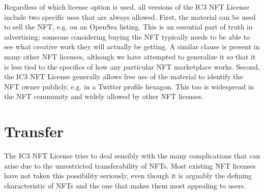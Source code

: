 \documentclass{article}
\newcommand{\iccclicense}{IC3 NFT License\xspace}
\begin{document}
Regardless of which license option is used, all versions of the \iccclicense include two specific uses that are always allowed. First, the material can be used to sell the NFT, e.g. on an OpenSea listing. This is an essential part of truth in advertising; someone considering buying the NFT typically needs to be able to see what creative work they will actually be getting. A similar clause is present in many other NFT licenses, although we have attempted to generalize it so that it is less tied to the specifics of how any particular NFT marketplace works. Second, the \iccclicense generally allows free use of the material to identify the NFT owner publicly, e.g. in a Twitter profile hexagon. This too is widespread in the NFT community and widely allowed by other NFT licenses.


\section{Transfer}
\label{sec:trans}

The \iccclicense tries to deal sensibly with the many complications that can arise due to the unrestricted transferability of NFTs. Most existing NFT licenses have not taken this possibility seriously, even though it is arguably the defining characteristic of NFTs and the one that makes them most appealing to users.
\end{document}
